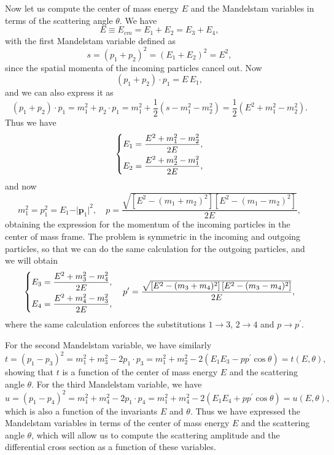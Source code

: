 Now let us compute the center of mass energy \(E\) and the Mandelstam variables in terms of the scattering angle \(\theta\). We have
\[
    E \equiv E_{cm} = E_1 + E_2 = E_3 + E_4,
\]
with the first Mandelstam variable defined as
\[
    s = (p_1 + p_2)^2 = (E_1 + E_2)^2 = E^2,
\]
since the spatial momenta of the incoming particles cancel out. Now
\[
    (p_1 + p_2) \cdot p_1 = E \, E_1,
\]
and we can also express it as
\[
    (p_1 + p_2) \cdot p_1 = m_1^2 + p_2 \cdot p_1 = m_1^2 + \frac{1}{2}(s - m_1^2 - m_2^2) = \frac{1}{2}(E^2 + m_1^2 - m_2^2).
\]
Thus we have
\[
    \begin{dcases}
        E_1 = \frac{E^2 + m_1^2 - m_2^2}{2E}, \\
        E_2 = \frac{E^2 + m_2^2 - m_1^2}{2E}, \\
    \end{dcases}
\]
and now
\[
    m_1^2 = p_1^2 = E_1 - \vert \mathbf{p}_1 \vert^2, \quad p = \frac{\sqrt{\left[E^2 - (m_1 + m_2)^2\right]\left[E^2 - (m_1 - m_2)^2\right]}}{2E},
\]
obtaining the expression for the momentum of the incoming particles in the center of mass frame. The problem is symmetric in the incoming and outgoing particles, so that we can do the same calculation for the outgoing particles, and we will obtain
\[
    \begin{dcases}
        E_3 = \frac{E^2 + m_3^2 - m_4^2}{2E}, \\
        E_4 = \frac{E^2 + m_4^2 - m_3^2}{2E},
    \end{dcases} \quad p^{\prime} = \frac{\sqrt{\left[E^2 - (m_3 + m_4)^2\right]\left[E^2 - (m_3 - m_4)^2\right]}}{2E},
\]
where the same calculation enforces the substitutions \(1 \to 3\), \(2 \to 4\) and \(p \to p^{\prime}\).

For the second Mandelstam variable, we have similarly
\[
    t = (p_1 - p_3)^2 = m_1^2 + m_3^2 - 2 p_1 \cdot p_3 = m_1^2 + m_2^2 - 2(E_1 E_3 - p p^{\prime} \cos \theta) = t(E, \theta),
\]
showing that \(t\) is a function of the center of mass energy \(E\) and the scattering angle \(\theta\). For the third Mandelstam variable, we have
\[
    u = (p_1 - p_4)^2 = m_1^2 + m_4^2 - 2 p_1 \cdot p_4 = m_1^2 + m_4^2 - 2(E_1 E_4 + p p^{\prime} \cos \theta) = u(E, \theta),
\]
which is also a function of the invariants \(E\) and \(\theta\). Thus we have expressed the Mandelstam variables in terms of the center of mass energy \(E\) and the scattering angle \(\theta\), which will allow us to compute the scattering amplitude and the differential cross section as a function of these variables.

